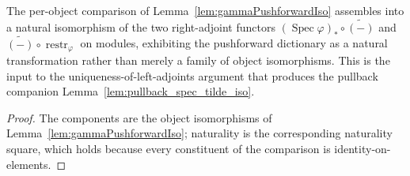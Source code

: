 \begin{lemma}

  \label{lem:gammaPushforwardNatIso}
  The per-object comparison of Lemma~\ref{lem:gammaPushforwardIso} assembles into a
  natural isomorphism of the two right-adjoint functors
  \((\operatorname{Spec}\varphi)_* \circ \widetilde{(-)}\) and
  \(\widetilde{(-)} \circ \operatorname{restr}_\varphi\) on modules, exhibiting the
  pushforward dictionary as a natural transformation rather than merely a family of
  object isomorphisms. This is the input to the uniqueness-of-left-adjoints argument
  that produces the pullback companion Lemma~\ref{lem:pullback_spec_tilde_iso}.
\end{lemma}
\begin{proof}
  The components are the object isomorphisms of Lemma~\ref{lem:gammaPushforwardIso};
  naturality is the corresponding naturality square, which holds because every
  constituent of the comparison is identity-on-elements.
\end{proof}

